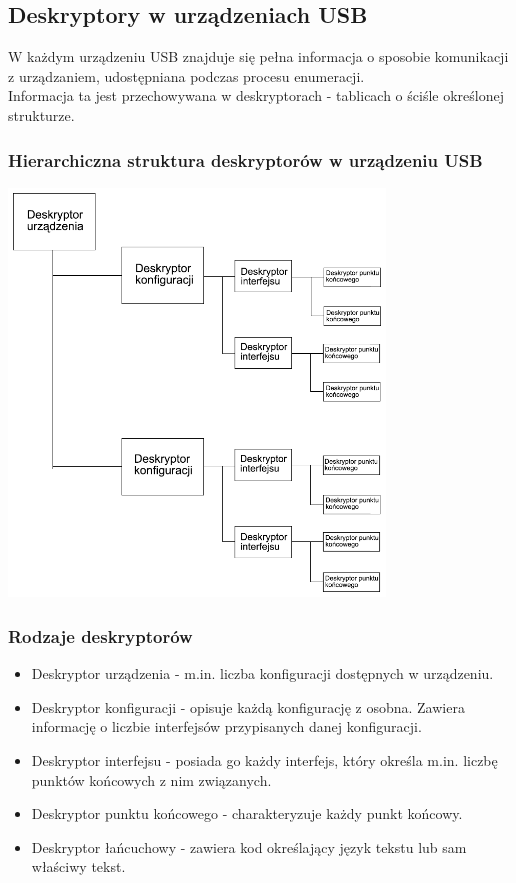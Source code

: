 \subsection{Deskryptory w urządzeniach USB}
	W każdym urządzeniu USB znajduje się pełna informacja o sposobie komunikacji z urządzaniem, udostępniana podczas procesu enumeracji.\\
	Informacja ta jest przechowywana w deskryptorach - tablicach o ściśle określonej strukturze.
	\subsubsection{Hierarchiczna struktura deskryptorów w urządzeniu USB}
	\includegraphics[width=10cm]{./wyklady/USB_24_1.pdf}
	\subsubsection{Rodzaje deskryptorów}
	\begin{itemize}
		\item Deskryptor urządzenia - m.in. liczba konfiguracji dostępnych w urządzeniu.
		\item Deskryptor konfiguracji - opisuje każdą konfigurację z osobna. Zawiera informację o liczbie interfejsów przypisanych danej konfiguracji.
		\item Deskryptor interfejsu - posiada go każdy interfejs, który określa m.in. liczbę punktów końcowych z nim związanych.
		\item Deskryptor punktu końcowego - charakteryzuje każdy punkt końcowy.
		\item Deskryptor łańcuchowy - zawiera kod określający język tekstu lub sam właściwy tekst.
	\end{itemize}
	
